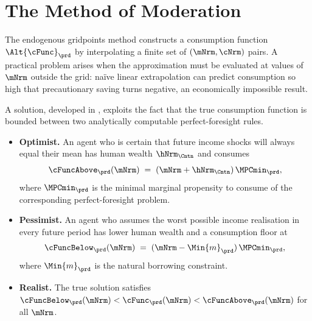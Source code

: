 \documentclass[SolvingMicroDSOPs]{subfiles}
\begin{document}
\hypertarget{method-of-moderation}{}
\section{The Method of Moderation}\label{sec:method-of-moderation}

The endogenous gridpoints method constructs a consumption function
$\Alt{\cFunc}_{\prd}$ by interpolating a finite set of
$(\mNrm,\cNrm)$ pairs.  A practical problem arises when the
approximation must be evaluated at values of $\mNrm$ outside the
grid: na\"ive linear extrapolation can predict consumption so high
that precautionary saving turns negative, an economically impossible
result.

A solution, developed in \cite{method-of-moderation}, exploits the fact that the
true consumption function is bounded between two analytically
computable perfect-foresight rules.
\begin{itemize}
  \item \textbf{Optimist.} An agent who is certain that future income
  shocks will always equal their mean has human wealth
  $\hNrm_{\Cntn}$ and consumes
  \begin{equation}
    \cFuncAbove_{\prd}(\mNrm) \;=\;
      (\mNrm + \hNrm_{\Cntn})\,\MPCmin_{\prd},
      \label{eq:cFuncAboveBrief}
  \end{equation}
  where $\MPCmin_{\prd}$ is the minimal marginal propensity to
  consume of the corresponding perfect-foresight problem.
  \item \textbf{Pessimist.} An agent who assumes the worst possible
  income realisation in every future period has lower human wealth and
  a consumption floor at
  \begin{equation}
    \cFuncBelow_{\prd}(\mNrm) \;=\;
      (\mNrm - \Min{m}_{\prd})\,\MPCmin_{\prd},
      \label{eq:cFuncBelowBrief}
  \end{equation}
  where $\Min{m}_{\prd}$ is the natural borrowing constraint.
  \item \textbf{Realist.}  The true solution satisfies
  $\cFuncBelow_{\prd}(\mNrm) < \cFunc_{\prd}(\mNrm) <
  \cFuncAbove_{\prd}(\mNrm)$ for all $\mNrm$.
\end{itemize}
\end{document}

